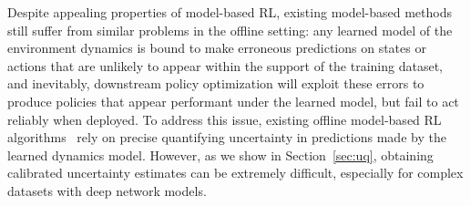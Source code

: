 \documentclass[../thesis.tex]{subfiles}
\begin{document}
Despite appealing properties of model-based RL, existing model-based methods still suffer from similar problems in the offline setting: any learned model of the environment dynamics is bound to make erroneous predictions on states or actions that are unlikely to appear within the support of the training dataset, and inevitably, downstream policy optimization will exploit these errors to produce policies that appear performant under the learned model, but fail to act reliably when deployed. To address this issue, existing offline model-based RL algorithms~\cite{kidambi2020morel, yu2020mopo} rely on precise quantifying uncertainty in predictions made by the learned dynamics model. However, as we show in Section~\ref{sec:uq}, obtaining calibrated uncertainty estimates can be extremely difficult, especially for complex datasets with deep network models.  
\end{document}
